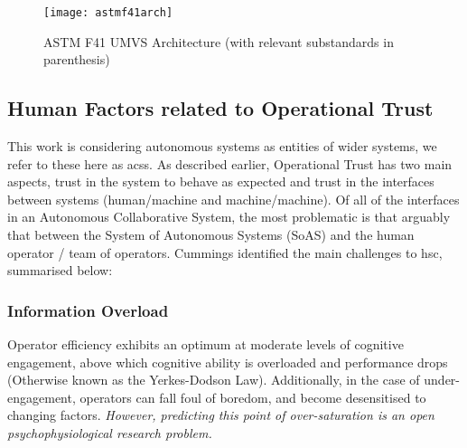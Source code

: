 \begin{figure}
  \texttt{[image: astmf41arch]}
  \caption{ASTM F41 UMVS Architecture  (with relevant substandards in parenthesis)}
  \label{fig:astmf41arch}
\end{figure}


\subsection{Human Factors related to Operational Trust}

This work is considering autonomous systems as entities of wider systems, we refer to these here as \glspl{acs}.
As described earlier, Operational Trust has two main aspects, trust in the system to behave as expected and trust in the interfaces between systems (human/machine and machine/machine).
Of all of the interfaces in an Autonomous Collaborative System, the most problematic is that arguably that between the System of Autonomous Systems (SoAS) and the human operator / team of operators.
Cummings identified the main challenges to \gls{hsc}, summarised below:\cite{Cummings2010}

\subsubsection{Information Overload}
Operator efficiency exhibits an optimum at moderate levels of cognitive engagement, above which cognitive ability is overloaded and performance drops (Otherwise known as the Yerkes-Dodson Law).
Additionally, in the case of under-engagement, operators can fall foul of boredom, and become desensitised to changing factors.
\textit{However, predicting this point of over-saturation is an open psychophysiological research problem.}

